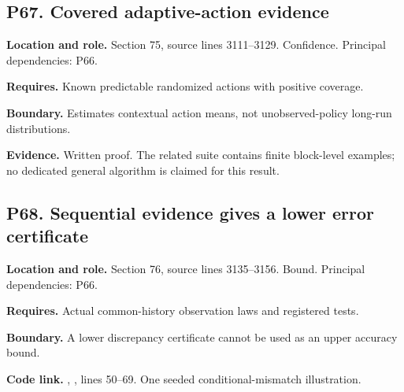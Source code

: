 \documentclass[11pt,letterpaper]{article}
\begin{document}
\par\noindent\begin{minipage}{\textwidth}
\subsection{P67. Covered adaptive-action
evidence}\label{p67.-covered-adaptive-action-evidence}

\textbf{Location and role.} Section 75, source lines 3111--3129.
Confidence. Principal dependencies: P66.

\textbf{Requires.} Known predictable randomized actions with positive
coverage.

\textbf{Boundary.} Estimates contextual action means, not
unobserved-policy long-run distributions.

\textbf{Evidence.} Written proof. The related suite contains finite
block-level examples; no dedicated general algorithm is claimed for this
result.
\end{minipage}\par\medskip

\par\noindent\begin{minipage}{\textwidth}
\subsection{P68. Sequential evidence gives a lower error
certificate}\label{p68.-sequential-evidence-gives-a-lower-error-certificate}

\textbf{Location and role.} Section 76, source lines 3135--3156. Bound.
Principal dependencies: P66.

\textbf{Requires.} Actual common-history observation laws and registered
tests.

\textbf{Boundary.} A lower discrepancy certificate cannot be used as an
upper accuracy bound.

\textbf{Code link.} ,
, lines 50--69. One seeded
conditional-mismatch illustration.
\end{minipage}\par\medskip
\end{document}
